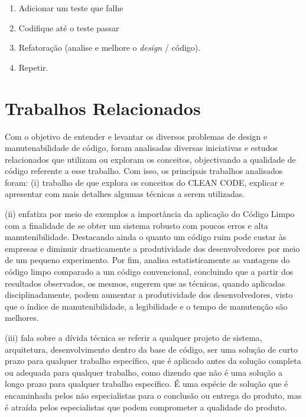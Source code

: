 \documentclass[12pt]{article}
\begin{document}
\begin{enumerate}
 \item Adicionar um teste que falhe
 \item Codifique até o teste passar
 \item Refatoração (analise e melhore o \textit{design} / código).
 \item Repetir.
\end{enumerate}

\part{Trabalhos Relacionados} \label{sec:trabalhosrelacionados}

Com o objetivo de entender e levantar os diversos problemas de design e manutenabilidade de código, foram analisadas diversas iniciativas e estudos relacionados que utilizam ou exploram os conceitos, objectivando a qualidade de código referente a esse trabalho.
Com isso, os principais trabalhos analisados foram: (i) trabalho de \cite{TR_CLEAN_CODE_INTRODUCAO} que explora os conceitos do CLEAN CODE, explicar e apresentar com mais detalhes algumas técnicas a serem utilizadas.

 (ii) \cite{TR_CLEAN_CODE_IMPORTANCIA} enfatiza por meio de exemplos a importância da aplicação do
Código Limpo com a finalidade de se obter um sistema robusto com poucos erros e alta manutenibilidade. Destacando ainda o quanto um código ruim pode custar às empresas e diminuir drasticamente a produtividade dos desenvolvedores por meio de um pequeno experimento. Por fim, analisa estatisticamente as vantagens do código limpo comparado a um código convencional, concluindo que a partir dos resultados observados, os mesmos, sugerem que as técnicas, quando aplicadas disciplinadamente, podem aumentar a produtividade dos desenvolvedores, visto que o índice de manutenibilidade, a legibilidade e o tempo de manutenção são melhores.

 (iii) \cite{TR_QC_TECHNICAL_DEBT} fala sobre a dívida técnica se referir a qualquer projeto de sistema, arquitetura, desenvolvimento dentro da base de código, ser uma solução de curto prazo para qualquer trabalho específico, que é aplicado antes da solução completa ou adequada para
qualquer trabalho, como dizendo que não é uma solução a longo prazo para qualquer trabalho específico. É uma espécie de solução que é encaminhada pelos não especialistas para o conclusão ou entrega do produto, mas é atraída pelos especialistas que podem comprometer a qualidade do produto.
\end{document}
